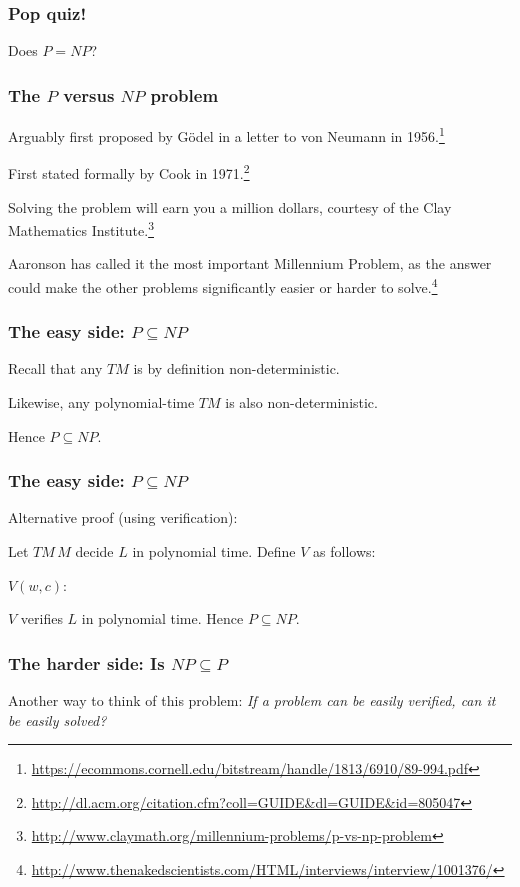 \documentclass[aspectratio=169]{beamer}
\begin{document}
\begin{frame}
\frametitle{Pop quiz!}
\centerline{Does $P=NP$?}
\end{frame}

\begin{frame}
\frametitle{The $P$ versus $NP$ problem}
Arguably first proposed by G\"{o}del in a letter to von Neumann in 1956.\footnote{\url{https://ecommons.cornell.edu/bitstream/handle/1813/6910/89-994.pdf}}

First stated formally by Cook in 1971.\footnote{\url{http://dl.acm.org/citation.cfm?coll=GUIDE&dl=GUIDE&id=805047}}

Solving the problem will earn you a million dollars, courtesy of the Clay Mathematics Institute.\footnote{\url{http://www.claymath.org/millennium-problems/p-vs-np-problem}}

Aaronson has called it the most important Millennium Problem, as the answer could make the other problems significantly easier or harder to solve.\footnote{\url{http://www.thenakedscientists.com/HTML/interviews/interview/1001376/}}
\end{frame}

\begin{frame}
\frametitle{The easy side: $P \subseteq NP$}

Recall that any $TM$ is by definition non-deterministic.

Likewise, any polynomial-time $TM$ is also non-deterministic.

Hence $P \subseteq NP$.
\end{frame}

\begin{frame}
\frametitle{The easy side: $P \subseteq NP$}

Alternative proof (using verification):

Let $TM\, M$ decide $L$ in polynomial time. Define $V$ as follows:

\begin{algorithm}[H]
$V(w, c):$\\
\end{algorithm}

$V$ verifies $L$ in polynomial time. Hence $P \subseteq NP$.
\end{frame}

\begin{frame}
\frametitle{The harder side: Is $NP \subseteq P$}

Another way to think of this problem: {\em If a problem can be easily verified, can it be easily solved?}
\end{frame}
\end{document}
